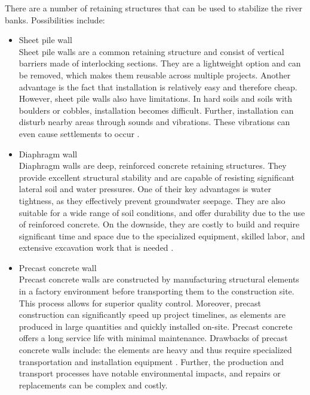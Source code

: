 There are a number of retaining structures that can be used to stabilize the river banks. Possibilities include:
\begin{itemize}
    \item Sheet pile wall\\
    Sheet pile walls are a common retaining structure and consist of vertical barriers made of interlocking sections. They are a lightweight option and can be removed, which makes them reusable across multiple projects. Another advantage is the fact that installation is relatively easy and therefore cheap. However, sheet pile walls also have limitations. In hard soils and soils with boulders or cobbles, installation becomes difficult. Further, installation can disturb nearby areas through sounds and vibrations. These vibrations can even cause settlements to occur \autocite{mandykorffReaderDeepExcavations2023}.

    \item Diaphragm wall\\
    Diaphragm walls are deep, reinforced concrete retaining structures. They provide excellent structural stability and are capable of resisting significant lateral soil and water pressures. One of their key advantages is water tightness, as they effectively prevent groundwater seepage. They are also suitable for a wide range of soil conditions, and offer durability due to the use of reinforced concrete. On the downside, they are costly to build and require significant time and space due to the specialized equipment, skilled labor, and extensive excavation work that is needed \autocite{mandykorffReaderDeepExcavations2023}.
    
    \item Precast concrete wall\\
    Precast concrete walls are constructed by manufacturing structural elements in a factory environment before transporting them to the construction site. This process allows for superior quality control. Moreover, precast construction can significantly speed up project timelines, as elements are produced in large quantities and quickly installed on-site. Precast concrete offers a long service life with minimal maintenance. Drawbacks of precast concrete walls include: the elements are heavy and thus require specialized transportation and installation equipment \autocite{mcneilengineeringAdvantagesDisadvantagesUsing2023}. Further, the production and transport processes have notable environmental impacts, and repairs or replacements can be complex and costly.


\end{itemize}
